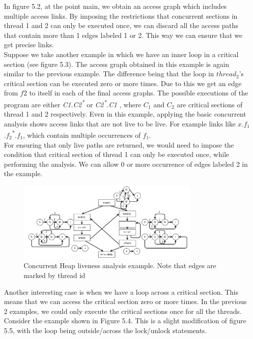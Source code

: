 In figure 5.2, at the point main, we obtain an access graph which includes multiple access links. By imposing the restrictions that concurrent sections in thread 1 and 2 can only be executed once, we can discard all the access paths that contain more than 1 edges labeled 1 or 2. This way we can ensure that we get precise links. \\

Suppose we take another example in which we have an inner loop in a critical section (see figure 5.3). The access  graph obtained in this example is again similar to the previous example. The difference being that the loop in $thread_2$'s critical section can be executed zero or more times. Due to this we get an edge from $f2$ to itself in each of the final access graphs. The possible executions of the program are either \emph{C1.C2\textsuperscript{*} } or \emph{ C2\textsuperscript{*}.C1 } , where $C_1$ and $C_2$ are critical sections of thread 1 and 2 respectively. Even in this example, applying the basic concurrent analysis shows access links that are not live to be live. For example links like {$x$.$f_1$.$f_2$\textsuperscript{*}.$f_1$}, which contain multiple occurrences of $f_1$. \\

For ensuring that only live paths are returned, we would need to impose the condition that critical section of thread 1 can only be executed once, while performing the analysis. We can allow 0 or more occurrence of edges labeled 2 in the example. \\ 

\begin{figure}
	\centering
	\includegraphics[width=0.8\textwidth]{Figures/rsz_loop_inside.png}
	\caption{Concurrent Heap liveness analysis example. Note that edges are marked by thread id}
	\label{fig:threadidanalysis}
\end{figure}

Another interesting case is when we have a loop across a critical section. This means that we can access the critical section zero or more times. In the previous 2 examples, we could only execute the critical sections once for all the threads. Consider the example shown in Figure 5.4. This is a slight modification of figure 5.5, with the loop being outside/across the lock/unlock statements.        